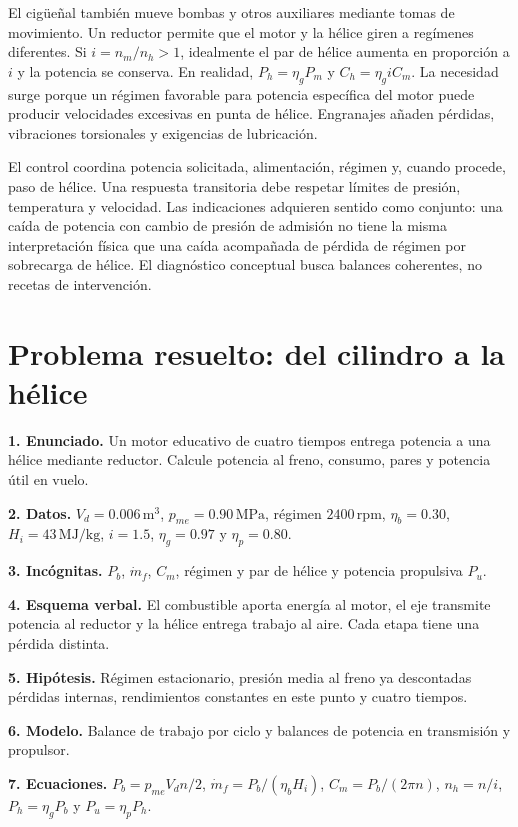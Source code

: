 El cigüeñal también mueve bombas y otros auxiliares mediante tomas de movimiento. Un reductor permite que el motor y la hélice giren a regímenes diferentes. Si $i=n_m/n_h>1$, idealmente el par de hélice aumenta en proporción a $i$ y la potencia se conserva. En realidad, $P_h=\eta_gP_m$ y $C_h=\eta_g i C_m$. La necesidad surge porque un régimen favorable para potencia específica del motor puede producir velocidades excesivas en punta de hélice. Engranajes añaden pérdidas, vibraciones torsionales y exigencias de lubricación.

El control coordina potencia solicitada, alimentación, régimen y, cuando procede, paso de hélice. Una respuesta transitoria debe respetar límites de presión, temperatura y velocidad. Las indicaciones adquieren sentido como conjunto: una caída de potencia con cambio de presión de admisión no tiene la misma interpretación física que una caída acompañada de pérdida de régimen por sobrecarga de hélice. El diagnóstico conceptual busca balances coherentes, no recetas de intervención.

\section{Problema resuelto: del cilindro a la hélice}
\textbf{1. Enunciado.} Un motor educativo de cuatro tiempos entrega potencia a una hélice mediante reductor. Calcule potencia al freno, consumo, pares y potencia útil en vuelo.

\textbf{2. Datos.} $V_d=0.006\,\mathrm{m^3}$, $p_{me}=0.90\,\mathrm{MPa}$, régimen $2400\,\mathrm{rpm}$, $\eta_b=0.30$, $H_i=43\,\mathrm{MJ/kg}$, $i=1.5$, $\eta_g=0.97$ y $\eta_p=0.80$.

\textbf{3. Incógnitas.} $P_b$, $\dot m_f$, $C_m$, régimen y par de hélice y potencia propulsiva $P_u$.

\textbf{4. Esquema verbal.} El combustible aporta energía al motor, el eje transmite potencia al reductor y la hélice entrega trabajo al aire. Cada etapa tiene una pérdida distinta.

\textbf{5. Hipótesis.} Régimen estacionario, presión media al freno ya descontadas pérdidas internas, rendimientos constantes en este punto y cuatro tiempos.

\textbf{6. Modelo.} Balance de trabajo por ciclo y balances de potencia en transmisión y propulsor.

\textbf{7. Ecuaciones.} $P_b=p_{me}V_dn/2$, $\dot m_f=P_b/(\eta_bH_i)$, $C_m=P_b/(2\pi n)$, $n_h=n/i$, $P_h=\eta_gP_b$ y $P_u=\eta_pP_h$.

